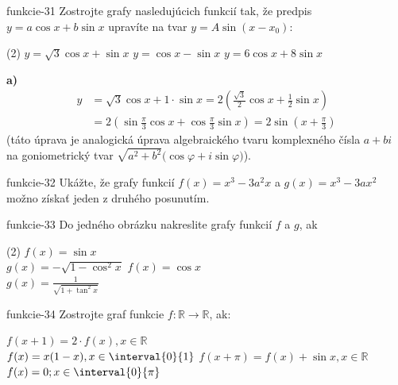 \begin{defproblem}{funkcie-31}
Zostrojte grafy nasledujúcich funkcií tak, že predpis $y=a\cos x +b\sin x$
upravíte na tvar $y=A\sin (x-x_0)$:
\begin{tasks}(2)
  \task $y=\sqrt{3}\cos x +\sin x$
  \task $y=\cos x -\sin x$
  \task $y=6\cos x +8\sin x$
\end{tasks}

\begin{solution}
\textbf{a)}
\vspace{-.5cm}
\begin{align*}
  y
    &= \sqrt{3} \cos{x} + 1 \cdot \sin{x}
      = 2(\frac{\sqrt{3}}{2} \cos{x} + \frac{1}{2}\sin{x}) \\
    &= 2(\sin{\frac{\pi}{3}} \cos{x} + \cos{\frac{\pi}{3}}\sin{x})
      = 2\sin{(x + \frac{\pi}{3})}
\end{align*}
(táto úprava je analogická úprava algebraického tvaru komplexného čísla $a + bi$
na goniometrický tvar $\sqrt{a^2 + b^2}(\cos{\varphi} + i \sin{\varphi)}$).
\end{solution}
\end{defproblem}

\begin{defproblem}{funkcie-32}
Ukážte, že grafy funkcií $f(x)=x^3-3a^2x$ a $g(x)=x^3-3ax^2$ možno získať jeden z druhého posunutím.
\end{defproblem}

\begin{defproblem}{funkcie-33}
Do jedného obrázku nakreslite grafy funkcií $f$ a $g$, ak
\begin{tasks}(2)
  \task
    $ f(x)=\sin x $ \\
    $ g(x)=-\sqrt{1-\cos^2 x} $
  \task
    $ f(x)=\cos x $ \\
    $ g(x)=\frac{1}{\sqrt{1+\tan^2 x}} $
\end{tasks}
\end{defproblem}

\begin{defproblem}{funkcie-34}
Zostrojte graf funkcie $f:\mathbb{R} \rightarrow \mathbb{R}$, ak:
\begin{tasks}
  \task
    $ f(x+1) = 2 \cdot f(x), x \in \mathbb{R} $ \\
    $ f(x) = x(1-x), x \in \interval{0}{1} $
  \task
    $ f(x+\pi)=f(x) + \sin{x}, x \in \mathbb{R} $ \\
    $ f(x) = 0; x \in \interval{0}{\pi} $
\end{tasks}
\end{defproblem}

